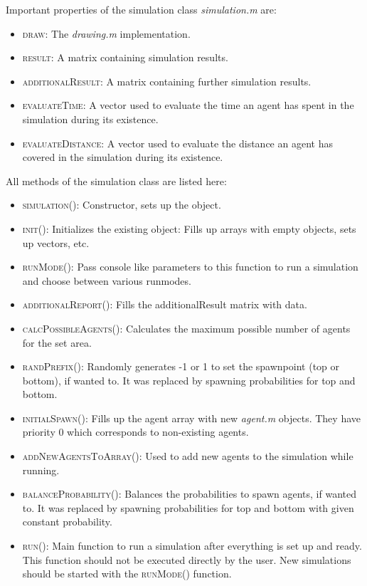 \noi Important properties of the simulation class \textit{simulation.m} are:
\begin{itemize}
\item \textsc{draw}: The \textit{drawing.m} implementation.
\item \textsc{result}: A matrix containing simulation results.
\item \textsc{additionalResult}: A matrix containing further simulation results.
\item \textsc{evaluateTime}: A vector used to evaluate the time an agent has spent in the simulation during its existence. %
\item \textsc{evaluateDistance}: A vector used to evaluate the distance an agent has covered in the simulation during its existence. %
\end{itemize}
\pagebreak
\noi All methods of the simulation class are listed here:
\begin{itemize}
\item \textsc{simulation()}: Constructor, sets up the object.
\item \textsc{init()}: Initializes the existing object: Fills up arrays with empty objects, sets up vectors, etc.
\item \textsc{runMode()}: Pass console like parameters to this function to run a simulation and choose between various runmodes.
\item \textsc{additionalReport()}: Fills the additionalResult matrix with data.
\item \textsc{calcPossibleAgents()}: Calculates the maximum possible number of agents for the set area. 
\item \textsc{randPrefix()}: Randomly generates -1 or 1 to set the spawnpoint (top or bottom), if wanted to. It was replaced by spawning probabilities for top and bottom.
\item \textsc{initialSpawn()}: Fills up the agent array with new \textit{agent.m} objects. They have priority 0 which corresponds to non-existing agents.
\item \textsc{addNewAgentsToArray()}: Used to add new agents to the simulation while running.
\item \textsc{balanceProbability()}: Balances the probabilities to spawn agents, if wanted to. It was replaced by spawning probabilities for top and bottom with given constant probability.
\item \textsc{run()}: Main function to run a simulation after everything is set up and ready. This function should not be executed directly by the user. New simulations should be started with the \textsc{runMode()} function.
\end{itemize}

